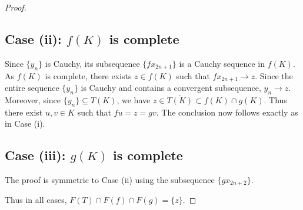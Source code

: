 \documentclass[10pt,a4paper]{amsart}
\begin{document}
\begin{proof}
\subsection*{Case (ii): $f(K)$ is complete}
Since $\{y_n\}$ is Cauchy, its subsequence $\{fx_{2n+1}\}$ is a Cauchy sequence in $f(K)$. As $f(K)$ is complete, there exists $z \in f(K)$ such that $fx_{2n+1} \to z$. Since the entire sequence $\{y_n\}$ is Cauchy and contains a convergent subsequence, $y_n \to z$. Moreover, since $\{y_n\} \subseteq T(K)$, we have $z \in \overline{T(K)} \subset f(K) \cap g(K)$. Thus there exist $u,v \in K$ such that $fu = z = gv$. The conclusion now follows exactly as in Case (i).

\subsection*{Case (iii): $g(K)$ is complete}
The proof is symmetric to Case (ii) using the subsequence $\{gx_{2n+2}\}$.

Thus in all cases, $F(T) \cap F(f) \cap F(g) = \{z\}$.
\end{proof}
\end{document}
